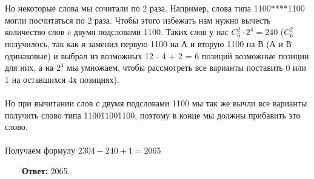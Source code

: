 \documentclass[a4paper, 12pt]{article}
\begin{document}
    \\
    \\Но некоторые слова мы сочитали по 2 раза. Например, слова типа 1100****1100 могли посчитаться по 2 раза. Чтобы этого избежать нам нужно вычесть количество слов c двумя подсловами 1100. Таких слов у нас $C_6^2 \cdot 2^4 = 240$ ($C_6^2$ получилось, так как я заменил первую 1100 на А и  вторую 1100 на В (А и В одинаковые) и выбрал из возможных 12 - 4 + 2 = 6 позиций возможные позиции для них, а на $2^4$ мы умножаем, чтобы рассмотреть все варианты поставить 0 или 1 на оставшихся 4х позициях). 
    \\
    \\Но при вычитании слов с двумя подсловами 1100 мы так же вычли все варианты получить слово типа 110011001100, поэтому в конце мы должны прибавить это слово.
    \\
    \\ Получаем формулу $2304 - 240 + 1 = 2065$
    \\
    \par \ \ \ \ \textbf{Ответ: } 2065.
    
\end{document}
